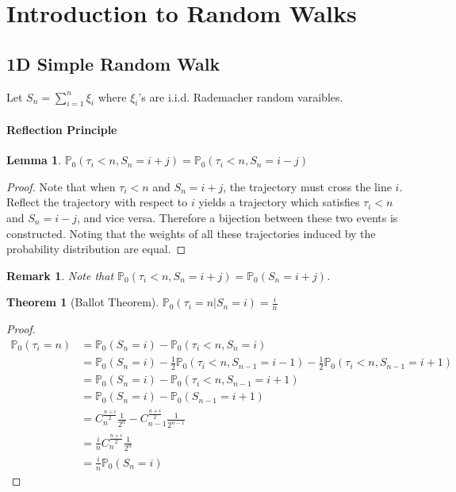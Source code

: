 \documentclass{article}
\newtheorem{Thm}{Theorem}[section]
\newtheorem{Lem}{Lemma}[section]
\newtheorem*{Rk}{Remark}
\theoremstyle{definition}
\newcommand{\PP}{\mathbb{P}}
\newcommand{\<}{\left\langle}
\renewcommand{\>}{\right\rangle}
\begin{document}
\section{Introduction to Random Walks}
\subsection{1D Simple Random Walk}
Let $S_n=\sum_{i=1}^{n}\xi_i$ where $\xi_i$'s are i.i.d. Rademacher random varaibles.
\paragraph{Reflection Principle}
\begin{Lem}
$\PP_0(\tau_i< n,S_n=i+j)=\PP_0(\tau_i< n,S_n=i-j)$
\end{Lem}
\begin{proof}
    Note that when $\tau_i<n$ and $S_n=i+j$, the trajectory must cross the line $i$. 
    Reflect the trajectory with respect to $i$ yields a trajectory which satisfies $\tau_i<n$ and $S_n=i-j$, and vice versa.
    Therefore a bijection between these two events is constructed. 
    Noting that the weights of all these trajectories induced by the probability distribution are equal.
\end{proof}
\begin{Rk}
    Note that $\PP_0(\tau_i< n,S_n=i+j)=\PP_0(S_n=i+j)$.
\end{Rk}

\begin{Thm}[Ballot Theorem]
    $\PP_0(\tau_i=n|S_n=i)=\frac{i}{n}$
\end{Thm}
\begin{proof}
    \begin{align*}
        \PP_0(\tau_i=n)&=\PP_0(S_n=i)-\PP_0(\tau_i<n,S_n=i)\\
                    &=\PP_0(S_n=i)-\frac{1}{2}\PP_0(\tau_i<n,S_{n-1}=i-1)-\frac{1}{2}\PP_0(\tau_i<n,S_{n-1}=i+1)\\
                    &=\PP_0(S_n=i)-\PP_0(\tau_i<n,S_{n-1}=i+1)\\
                    &=\PP_0(S_n=i)-\PP_0(S_{n-1}=i+1)\\
                    &=C_{n}^{\frac{n+i}{2}}\frac{1}{2^n}-C_{n-1}^{\frac{n+i}{2}}\frac{1}{2^{n-1}}\\
                    &=\frac{i}{n}C_{n}^{\frac{n+i}{2}}\frac{1}{2^n}\\
                    &=\frac{i}{n}\PP_0(S_n=i)
    \end{align*}
\end{proof}
\end{document}
